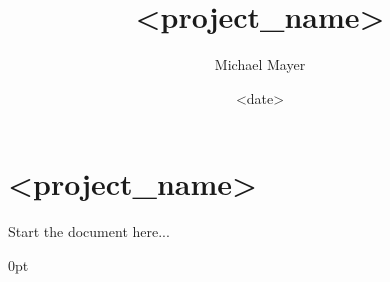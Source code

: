 

\title{<project_name>}
\date{<date>}
\author{Michael Mayer}


    
  \maketitle

  \newpage

  \tableofcontents

  \newpage

  \section{<project_name>}

    Start the document here...

  \newpage
  \begin{appendix}
      \begin{thebibliography}{0pt}
      \end{thebibliography}
      \listoffigures
      \listoftables
  \end{appendix}


